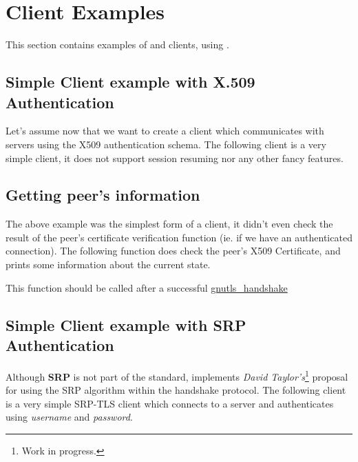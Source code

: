 \documentclass{book}
\begin{document}












\section{Client Examples}
This section contains examples of \tls and \ssl clients, using \gnutls. 

\subsection{Simple Client example with X.509 Authentication}
Let's assume now that we want to create a client which communicates
with servers using the X509 authentication schema. The following client
is a very simple \tls client, it does not support session resuming nor
any other fancy features.


\subsection{Getting peer's information}
\par The above example was the simplest form of a client, it didn't even check
the result of the peer's certificate verification function (ie. if we have
an authenticated connection). The following function does check the peer's X509
Certificate, and prints some information about the current state.
\par
This function should be called after a successful
\hyperref{gnutls\_handshake()}{gnutls\_handshake() (see Section }{)}{gnutls_handshake}





\subsection{Simple Client example with SRP Authentication}
Although {\bf SRP} is not part of the \tls standard, \gnutls implements
{\it David Taylor's}\footnote{Work in progress.} proposal for using the SRP algorithm
within the \tls handshake protocol. The following client
is a very simple SRP-TLS client which connects to a server 
and authenticates using {\it username} and {\it password}.
\end{document}
